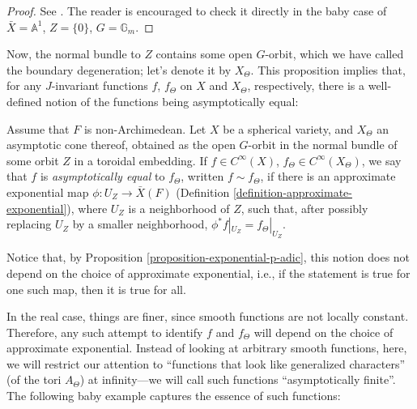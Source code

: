 \begin{proof}
 See \cite[Proposition 4.3.1]{Sakellaridis-Venkatesh}. The reader is encouraged to check it directly in the baby case of $\bar X=\mathbb A^1$, $Z=\{0\}$, $G=\mathbb G_m$.
\end{proof}

Now, the normal bundle to $Z$ contains some open $G$-orbit, which we have called the boundary degeneration; let's denote it by $X_\Theta$. This proposition implies that, for any $J$-invariant functions $f$, $f_\Theta$ on $X$ and $X_\Theta$, respectively, there is a well-defined notion of the functions being asymptotically equal:

\begin{definition}
 \label{definition-asymptotically-equal-padic}
Assume that $F$ is non-Archimedean. Let $X$ be a spherical variety, and $X_\Theta$ an asymptotic cone thereof, obtained as the open $G$-orbit in the normal bundle of some orbit $Z$ in a toroidal embedding. If $f\in C^\infty(X)$, $f_\Theta\in C^\infty(X_\Theta)$, we say that $f$ is {\it asymptotically equal} to $f_\Theta$, written $f\sim f_\Theta$, if there is an approximate exponential map $\phi: U_Z\to \bar X(F)$ (Definition \ref{definition-approximate-exponential}), where $U_Z$ is a neighborhood of $Z$, such that, after possibly replacing $U_Z$ by a smaller neighborhood, $\phi^* f|_{U_Z} = f_\Theta|_{U_Z}$.
\end{definition}

Notice that, by Proposition \ref{proposition-exponential-p-adic}, this notion does not depend on the choice of approximate exponential, i.e., if the statement is true for one such map, then it is true for all.

In the real case, things are finer, since smooth functions are not locally constant. Therefore, any such attempt to identify $f$ and $f_\Theta$ will depend on the choice of approximate exponential. Instead of looking at arbitrary smooth functions, here, we will restrict our attention to ``functions that look like generalized characters'' (of the tori $A_\Theta$) at infinity---we will call such functions ``asymptotically finite''. The following baby example captures the essence of such functions:

